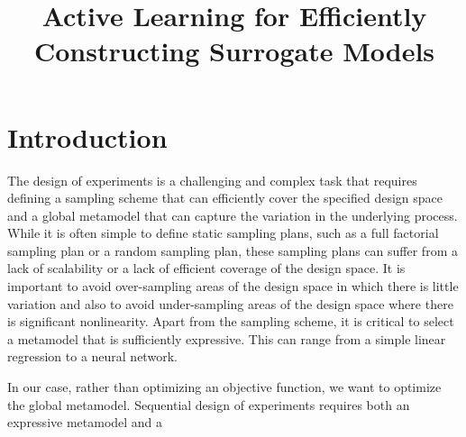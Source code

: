 \documentclass[conference]{IEEEtran}
\begin{document}
	
	
	\title{\LARGE \textbf{Active Learning for Efficiently Constructing Surrogate Models}}
	
	
	\author{
		} %
	
	
	\maketitle
	
	\begin{abstract}
		
	\end{abstract}
	
	
	\section{Introduction}
	\label{sec:introduction}
	
	
	The design of experiments is a challenging and complex task that requires defining a sampling scheme that can efficiently cover the specified design space and a global metamodel that can capture the variation in the underlying process. While it is often simple to define static sampling plans, such as a full factorial sampling plan or a random sampling plan, these sampling plans can suffer from a lack of scalability or a lack of efficient coverage of the design space. It is important to avoid over-sampling areas of the design space in which there is little variation and also to avoid under-sampling areas of the design space where there is significant nonlinearity. Apart from the sampling scheme, it is critical to select a metamodel that is sufficiently expressive. This can range from a simple linear regression to a neural network.
	
	In our case, rather than optimizing an objective function, we want to optimize the global metamodel.
	Sequential design of experiments requires both an expressive metamodel and a
	
\end{document}
